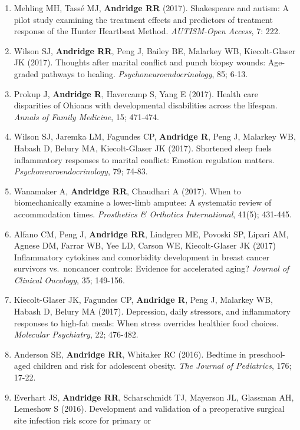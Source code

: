 \documentclass[
  english,
  letterpaper,
  DIV=11,
  numbers=noendperiod]{scrartcl}
\begin{document}
\begin{enumerate}
  \emph{Journal of Child and Adolescent Psychopharmacology}, 28;
  130-135.
\item
  Mehling MH, Tassé MJ, \textbf{Andridge RR} (2017). Shakespeare and
  autism: A pilot study examining the treatment effects and predictors
  of treatment response of the Hunter Heartbeat Method.
  \emph{AUTISM-Open Access}, 7: 222.
\item
  Wilson SJ, \textbf{Andridge RR}, Peng J, Bailey BE, Malarkey WB,
  Kiecolt-Glaser JK (2017). Thoughts after marital conflict and punch
  biopsy wounds: Age-graded pathways to healing.
  \emph{Psychoneuroendocrinology}, 85; 6-13.
\item
  Prokup J, \textbf{Andridge R}, Havercamp S, Yang E (2017). Health care
  disparities of Ohioans with developmental disabilities across the
  lifespan. \emph{Annals of Family Medicine}, 15; 471-474.
\item
  Wilson SJ, Jaremka LM, Fagundes CP, \textbf{Andridge R}, Peng J,
  Malarkey WB, Habash D, Belury MA, Kiecolt-Glaser JK (2017). Shortened
  sleep fuels inflammatory responses to marital conflict: Emotion
  regulation matters. \emph{Psychoneuroendocrinology}, 79; 74-83.
\item
  Wanamaker A, \textbf{Andridge RR}, Chaudhari A (2017). When to
  biomechanically examine a lower-limb amputee: A systematic review of
  accommodation times. \emph{Prosthetics \& Orthotics International},
  41(5); 431-445.
\item
  Alfano CM, Peng J, \textbf{Andridge RR}, Lindgren ME, Povoski SP,
  Lipari AM, Agnese DM, Farrar WB, Yee LD, Carson WE, Kiecolt-Glaser JK
  (2017) Inflammatory cytokines and comorbidity development in breast
  cancer survivors vs.~noncancer controls: Evidence for accelerated
  aging? \emph{Journal of Clinical Oncology}, 35; 149-156.
\item
  Kiecolt-Glaser JK, Fagundes CP, \textbf{Andridge R}, Peng J, Malarkey
  WB, Habash D, Belury MA (2017). Depression, daily stressors, and
  inflammatory responses to high-fat meals: When stress overrides
  healthier food choices. \emph{Molecular Psychiatry}, 22; 476-482.
\item
  Anderson SE, \textbf{Andridge RR}, Whitaker RC (2016). Bedtime in
  preschool-aged children and risk for adolescent obesity. \emph{The
  Journal of Pediatrics}, 176; 17-22.
\item
  Everhart JS, \textbf{Andridge RR}, Scharschmidt TJ, Mayerson JL,
  Glassman AH, Lemeshow S (2016). Development and validation of a
  preoperative surgical site infection risk score for primary or

\end{enumerate}
\end{document}
